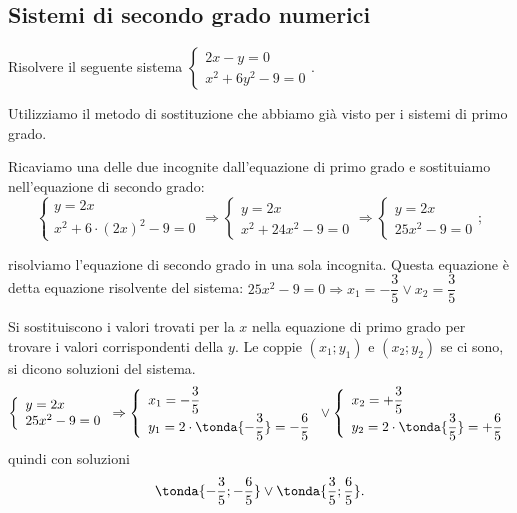 \subsection{Sistemi di secondo grado numerici}
\begin{esempio}
Risolvere il seguente sistema 
\(\left\{\begin{array}{l}{2x-y=0}\\{x^2+6y^2-9=0}\end{array}\right..\)

Utilizziamo il metodo di sostituzione che abbiamo già visto per i sistemi di 
primo grado.
\begin{itemize*}
\item Ricaviamo una delle due incognite dall'equazione di primo grado e 
sostituiamo nell'equazione di secondo grado:
\[\left\{\begin{array}{l}y=2x \\
x^2+6\cdot (2x)^2-9=0\end{array}\right. 
\Rightarrow\left\{\begin{array}{l}y=2x \\
x^2+24x^2-9=0\end{array}\right. 
\Rightarrow \left\{\begin{array}{l}y=2x \\
25x^2-9=0\end{array}\right.;\]
\item risolviamo l'equazione di secondo grado in una sola incognita. Questa 
equazione è detta equazione risolvente del sistema:
 \(25x^2-9=0\Rightarrow x_1=-\dfrac 3 5\vee x_2=\dfrac 3 5\)
\item Si sostituiscono i valori trovati per la \( x \) nella equazione di primo 
grado per trovare i valori corrispondenti della \( y \). Le coppie 
\((x_1;y_1)\) 
e 
\((x_2;y_2)\) se ci sono, si dicono soluzioni del sistema.
\[\left\{\begin{array}{l}{y=2x}\\
{25x^2-9=0}\end{array}\right. 
\Rightarrow \left\{\begin{array}{l}x_1=-\dfrac 3 5 \\
y_1=2\cdot \tonda{-\dfrac 3 5}=-\dfrac 6 5\end{array}\right.\vee 
\left\{\begin{array}{l}x_2=+\dfrac 3 5 \\
y_2=2\cdot \tonda{\dfrac 3 5}=+\dfrac 6 5 \end{array}\right.\] 
quindi con soluzioni 
\[\tonda{-\dfrac 3 5;-\dfrac 6 5}\vee \tonda{\dfrac 3 5;\dfrac 6 
5}.\]
\end{itemize*}


\end{esempio}
